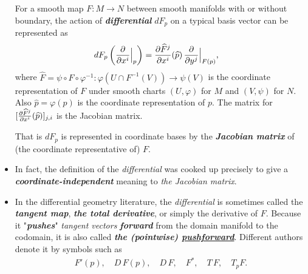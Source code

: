 \documentclass[11pt]{article}
\begin{document}
\begin{itemize}
\begin{definition}
For a smooth map $F: M \rightarrow N$ between smooth manifolds with or without boundary, the action of \emph{\textbf{differential}} $dF_{p}$ on a typical basis vector can be represented as
\begin{align}
dF_{p}\left(\frac{\partial }{ \partial x^{i}}\Bigr|_{p}\right) &= \frac{\partial \widehat{F}^{j}}{ \partial x^{i}}(\widehat{p})\,\frac{\partial }{ \partial y^{j}}\Bigr|_{F(p)}, \label{eqn: differential_coordinate_manifold}
\end{align} where  $\widehat{F} = \psi \circ F \circ \varphi^{-1}: \varphi(U \cap F^{-1}(V)) \rightarrow \psi(V)$ is the coordinate representation of $F$ under smooth charts $(U,\varphi)$ for $M$ and $(V, \psi)$ for $N$. Also $\widehat{p} = \varphi(p)$  is the coordinate representation of $p$. The matrix for $[\frac{\partial \widehat{F}^{j}}{ \partial x^{i}}(\widehat{p})]_{j,i}$ is the Jacobian matrix.

That is $dF_{p}$ is represented in coordinate bases by the \emph{\textbf{Jacobian matrix}} of (the coordinate representative of) $F$.
\end{definition}

\item In fact, the definition of the \emph{differential} was cooked up precisely to give a \emph{\textbf{coordinate-independent}} meaning to \emph{the Jacobian matrix}.

\item \begin{definition}
In the differential geometry literature, the \emph{differential} is sometimes called the \emph{\textbf{tangent map}}, \emph{\textbf{the total derivative}}, or simply the derivative of $F$. Because it "\emph{\textbf{pushes}}" \emph{tangent vectors} \emph{\textbf{forward}} from the domain manifold to the codomain, it is also called \emph{\textbf{the (pointwise) \underline{pushforward}}}. Different authors denote it by symbols such as
\begin{align*}
F'(p), \quad D\,F(p), \quad D\,F, \quad F^{*},\quad T\,F, \quad T_{p}F.
\end{align*}

\end{definition}
\end{itemize}
\end{document}
